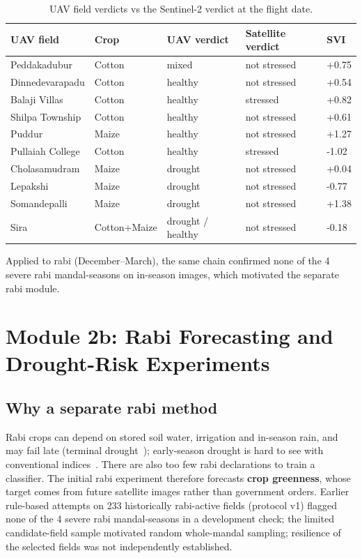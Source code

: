 \documentclass[11pt,a4paper,oneside]{article}
\begin{document}
\begin{table}[H]
\centering
\caption{UAV field verdicts vs the Sentinel-2 verdict at the flight date.}
\label{tab:s_uav}
\footnotesize
\begin{tabular}{@{}lllll@{}}
\toprule
\textbf{UAV field} & \textbf{Crop} & \textbf{UAV verdict} & \textbf{Satellite verdict} & \textbf{SVI} \\
\midrule
Peddakadubur & Cotton & mixed & not stressed & +0.75 \\
Dinnedevarapadu & Cotton & healthy & not stressed & +0.54 \\
Balaji Villas & Cotton & healthy & stressed & +0.82 \\
Shilpa Township & Cotton & healthy & not stressed & +0.61 \\
Puddur & Maize & healthy & not stressed & +1.27 \\
Pullaiah College & Cotton & healthy & stressed & -1.02 \\
Cholasamudram & Maize & drought & not stressed & +0.04 \\
Lepakshi & Maize & drought & not stressed & -0.77 \\
Somandepalli & Maize & drought & not stressed & +1.38 \\
Sira & Cotton+Maize & drought  / healthy & not stressed & -0.18 \\
\bottomrule
\end{tabular}
\end{table}


Applied to rabi (December--March), the same chain confirmed none of the 4 severe rabi mandal-seasons on in-season images, which motivated the separate rabi module.

\section{Module 2b: Rabi Forecasting and Drought-Risk Experiments}

\subsection{Why a separate rabi method}
Rabi crops can depend on stored soil water, irrigation and in-season rain, and may fail late (terminal drought~\cite{pang2017}); early-season drought is hard to see with conventional indices~\cite{nikam2020}. There are also too few rabi declarations to train a classifier. The initial rabi experiment therefore forecasts \textbf{crop greenness}, whose target comes from future satellite images rather than government orders. Earlier rule-based attempts on 233 historically rabi-active fields (protocol v1) flagged none of the 4 severe rabi mandal-seasons in a development check; the limited candidate-field sample motivated random whole-mandal sampling; resilience of the selected fields was not independently established.
\end{document}
